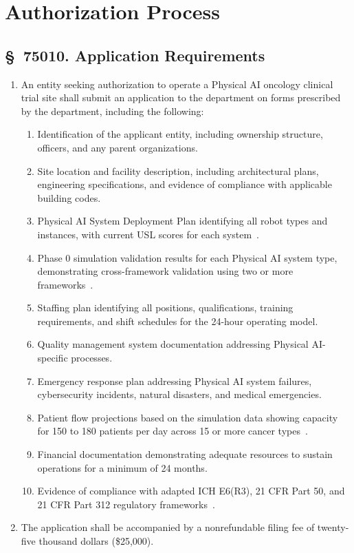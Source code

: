 \documentclass[11pt,letterpaper]{article}
\begin{document}
\section{Authorization Process}

\subsection{\S~75010. Application Requirements}

\begin{enumerate}[label=(\alph*)]
\item An entity seeking authorization to operate a Physical AI oncology
  clinical trial site shall submit an application to the department on forms
  prescribed by the department, including the following:
  \begin{enumerate}[label=(\arabic*)]
  \item Identification of the applicant entity, including ownership structure,
    officers, and any parent organizations.
  \item Site location and facility description, including architectural plans,
    engineering specifications, and evidence of compliance with applicable
    building codes.
  \item Physical AI System Deployment Plan identifying all robot types and
    instances, with current USL scores for each system~\cite{usl2026}.
  \item Phase 0 simulation validation results for each Physical AI system
    type, demonstrating cross-framework validation using two or more
    frameworks~\cite{iche6r3adapt}.
  \item Staffing plan identifying all positions, qualifications, training
    requirements, and shift schedules for the 24-hour operating model.
  \item Quality management system documentation addressing Physical AI-specific
    processes.
  \item Emergency response plan addressing Physical AI system failures,
    cybersecurity incidents, natural disasters, and medical emergencies.
  \item Patient flow projections based on the simulation data showing capacity
    for 150 to 180 patients per day across 15 or more cancer
    types~\cite{newtrial2026}.
  \item Financial documentation demonstrating adequate resources to sustain
    operations for a minimum of 24 months.
  \item Evidence of compliance with adapted ICH E6(R3), 21 CFR Part 50, and
    21 CFR Part 312 regulatory frameworks~\cite{iche6r3adapt,cfr50adapt,cfr312adapt}.
  \end{enumerate}

\item The application shall be accompanied by a nonrefundable filing fee of
  twenty-five thousand dollars (\$25,000).
\end{enumerate}
\end{document}
